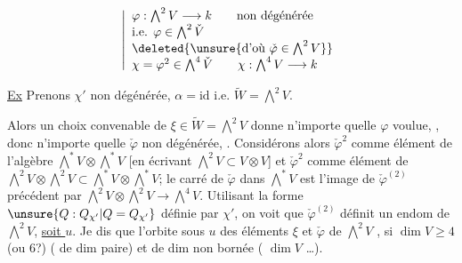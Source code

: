 \[
\left|\begin{array}{l}
\varphi:\bigwedge^2V\longrightarrow k\qquad\text{non dégénérée}\\
\text{i.e. }\varphi\in\bigwedge^2\check V\\
\deleted{\unsure{\text{d'où }\check\varphi\in\bigwedge^2V}}\\
\chi=\varphi^2\in\bigwedge^4\check V\qquad\chi:\bigwedge^4V\longrightarrow k
\end{array}\right.
\]

\uline{Ex} Prenons $\chi'$ non dégénérée,  $\alpha=\mathrm{id}$ i.e. $\widetilde W=\bigwedge^2V$.

Alors un choix convenable de $\xi\in\widetilde W=\bigwedge^2V$ donne n'importe quelle $\varphi$ voulue, , donc n'importe quelle $\check\varphi$  non dégénérée, . Considérons alors $\check\varphi^2$ comme élément de  l'algèbre $\bigwedge^*V\otimes\bigwedge^*V$ [en écrivant $\bigwedge^2V\subset V\otimes V$] et $\check\varphi^2$ comme élément de $\bigwedge^2V\otimes\bigwedge^2V\subset\bigwedge^*V\otimes\bigwedge^*V$; le carré de $\check\varphi$ dans $\bigwedge^*V$  est l'image de $\check\varphi^{(2)}$ précédent par $\bigwedge^2V\otimes\bigwedge^2V\longrightarrow\bigwedge^4V$. Utilisant la forme $\unsure{Q:Q_{\chi'}|Q=Q_{\chi'}}$ définie par $\chi'$, on voit que $\check\varphi^{(2)}$ définit un endom de $\bigwedge^2V$, \uline{soit $u$}. Je dis que l'orbite sous $u$ des éléments $\xi$ et $\check\varphi$ de $\bigwedge^2V$ , si $\dim V\geq4$ (ou $6$?) (  de dim paire) et   de dim non bornée ( $\dim V$ \ldots).
\deleted{$\unsure{\xi}$}
